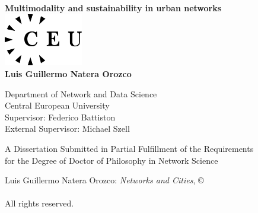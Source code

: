 \documentclass[a4paper,twoside,12pt]{book}
\begin{document}
\begin{titlepage}
	\begin{center}

		\textbf{\LARGE{Multimodality and sustainability in urban networks}}\\[3.3cm] %

		\includegraphics[width=3.45cm,height=2.3cm]{images/ceulogo.eps}\\[3.4cm]
		{\Large{\textbf{Luis Guillermo Natera Orozco}}}\\[0.4cm]

		\medskip

		Department of Network and Data Science \\
		Central European University\\ [1.2cm]

		Supervisor: Federico Battiston \\
		External Supervisor: Michael Szell

		\vfill

		A Dissertation Submitted in Partial Fulfillment of the Requirements\\ for the Degree of Doctor of Philosophy in Network Science\\[2cm]


		\vspace{1.0cm}
		\the\year
	\end{center}
\end{titlepage}

\newpage

\pagestyle{empty}

\mbox{}

\vfill

\noindent Luis Guillermo Natera Orozco: \emph{Networks and Cities}, \copyright \\
\the\year \\ All rights reserved.



\mbox{}

\pagestyle{empty}
\end{document}

